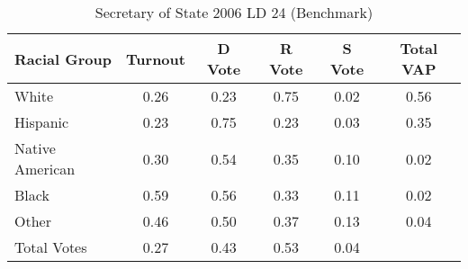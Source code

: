 \begin{table}[htb]
\begin{center}
\caption{Secretary of State 2006 LD 24 (Benchmark)}
\label{sos06_vap_ld_24_benchmark}
\begin{tabular}{lccccc}
  \hline
Racial Group & Turnout & D Vote & R Vote & S Vote & Total VAP \\ 
  \hline
White & 0.26 & 0.23 & 0.75 & 0.02 & 0.56 \\ 
  Hispanic & 0.23 & 0.75 & 0.23 & 0.03 & 0.35 \\ 
  Native American & 0.30 & 0.54 & 0.35 & 0.10 & 0.02 \\ 
  Black & 0.59 & 0.56 & 0.33 & 0.11 & 0.02 \\ 
  Other & 0.46 & 0.50 & 0.37 & 0.13 & 0.04 \\ 
  Total Votes & 0.27 & 0.43 & 0.53 & 0.04 &  \\ 
   \hline
\end{tabular}
\end{center}
\end{table}
